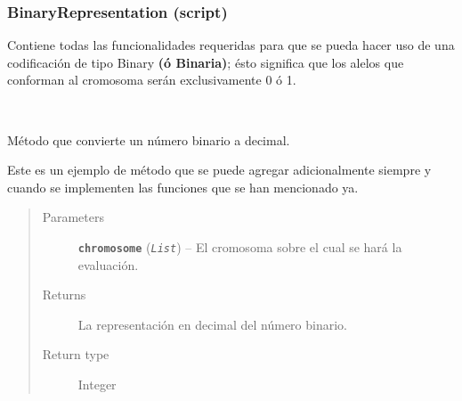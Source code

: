 \documentclass[letterpaper,10pt,english]{sphinxmanual}
\begin{document}
\subsubsection{BinaryRepresentation (script)}
\label{Model/ChromosomalRepresentation/BinaryRepresentation:binaryrepresentation-script}\label{Model/ChromosomalRepresentation/BinaryRepresentation::doc}
\begin{DUlineblock}{0em}
\item[] Contiene todas las funcionalidades requeridas para que se pueda hacer uso de una
codificación de tipo Binary \textbf{(ó Binaria)}; ésto significa que los alelos que
conforman al cromosoma serán exclusivamente 0 ó 1.
\end{DUlineblock}
\label{Model/ChromosomalRepresentation/BinaryRepresentation:module-Model.ChromosomalRepresentation.BinaryRepresentation}

\begin{fulllineitems}
\label{Model/ChromosomalRepresentation/BinaryRepresentation:Model.ChromosomalRepresentation.BinaryRepresentation.binary_to_decimal}~
\begin{DUlineblock}{0em}
\item[] Método que convierte un número binario a decimal.
\item[] Este es un ejemplo de método que se puede agregar
adicionalmente siempre y cuando se implementen las 
funciones que se han mencionado ya.
\end{DUlineblock}
\begin{quote}\begin{description}
\item[{Parameters}] \leavevmode
\textbf{\texttt{chromosome}} (\emph{\texttt{List}}) -- El cromosoma sobre el cual se hará
la evaluación.

\item[{Returns}] \leavevmode
La representación en decimal del número binario.

\item[{Return type}] \leavevmode
Integer

\end{description}\end{quote}

\end{fulllineitems}
\end{document}
